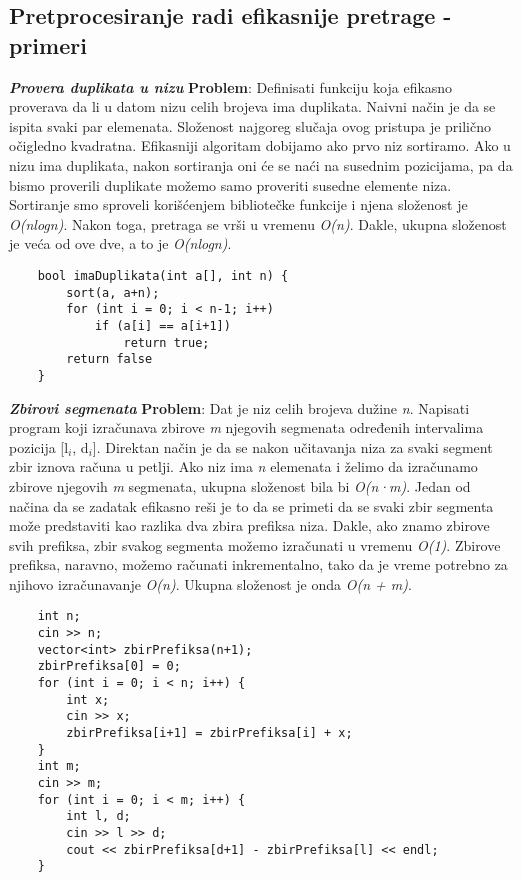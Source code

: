 \documentclass{article}
\begin{document}
\subsection{Pretprocesiranje radi efikasnije pretrage - primeri}
\textit{\textbf{Provera duplikata u nizu}}
\newline \textbf{Problem}: Definisati funkciju koja efikasno proverava da li u datom nizu celih
brojeva ima duplikata.
\newline Naivni način je da se ispita svaki par elemenata. Složenost najgoreg slučaja ovog pristupa je prilično očigledno kvadratna.
\newline 
Efikasniji algoritam dobijamo ako prvo niz sortiramo. Ako u nizu ima duplikata,
nakon sortiranja oni će se naći na susednim pozicijama, pa da bismo proverili
duplikate možemo samo proveriti susedne elemente niza. 
Sortiranje smo sproveli korišćenjem bibliotečke funkcije i njena složenost je \textit{O(nlogn)}. Nakon toga, pretraga se vrši u vremenu \textit{O(n)}. Dakle, ukupna
složenost je veća od ove dve, a to je \textit{O(nlogn)}.
\newpage
\begin{lstlisting}
    bool imaDuplikata(int a[], int n) {
        sort(a, a+n);
        for (int i = 0; i < n-1; i++)
            if (a[i] == a[i+1])
                return true;
        return false
    }
\end{lstlisting}
\vspace{0.2cm}
\textit{\textbf{Zbirovi segmenata}}
\newline 
\textbf{Problem}: Dat je niz celih brojeva dužine \textit{n}. Napisati program koji izračunava
zbirove \textit{m} njegovih segmenata određenih intervalima pozicija [l$_i$, d$_i$].
\newline 
Direktan način je da se nakon učitavanja niza za svaki segment zbir iznova računa
u petlji. Ako niz ima \textit{n} elemenata i želimo da izračunamo zbirove njegovih \textit{m}
segmenata, ukupna složenost bila bi \textit{O(n·m)}.
\newline Jedan od načina da se zadatak efikasno reši je to da se primeti da se svaki
zbir segmenta može predstaviti kao razlika dva zbira prefiksa niza. Dakle, ako znamo zbirove svih prefiksa, zbir svakog segmenta možemo izračunati
u vremenu \textit{O(1)}. Zbirove prefiksa, naravno, možemo računati inkrementalno,
tako da je vreme potrebno za njihovo izračunavanje \textit{O(n)}. Ukupna složenost je
onda \textit{O(n + m)}.
\begin{lstlisting}
    int n;
    cin >> n;
    vector<int> zbirPrefiksa(n+1);
    zbirPrefiksa[0] = 0;
    for (int i = 0; i < n; i++) {
        int x;
        cin >> x;
        zbirPrefiksa[i+1] = zbirPrefiksa[i] + x;
    }
    int m;
    cin >> m;
    for (int i = 0; i < m; i++) {
        int l, d;
        cin >> l >> d;
        cout << zbirPrefiksa[d+1] - zbirPrefiksa[l] << endl;
    }
\end{lstlisting}
\end{document}

